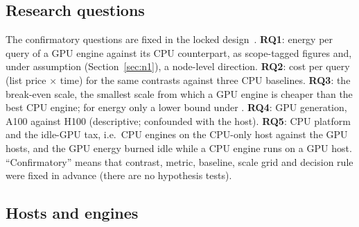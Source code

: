 \documentclass[sigconf]{acmart}
\begin{document}
\subsection{Research questions}
\label{sec:rqs}
The confirmatory questions are fixed in the locked design~\citelock{}. \textbf{RQ1}: energy
per query of a GPU engine against its CPU counterpart, as scope-tagged figures and, under
assumption \NOne{} (Section~\ref{sec:n1}), a node-level direction. \textbf{RQ2}: cost per
query (list price $\times$ time) for the same contrasts against three CPU baselines.
\textbf{RQ3}: the break-even scale, the smallest scale from which a GPU engine is cheaper
than the best CPU engine; for energy only a lower bound under \NOne. \textbf{RQ4}: GPU
generation, A100 against H100 (descriptive; confounded with the host).
\textbf{RQ5}: CPU platform and the idle-GPU tax, i.e.\ CPU engines on the CPU-only host
against the GPU hosts, and the GPU energy burned idle while a CPU engine runs on a GPU host.
``Confirmatory'' means that contrast, metric, baseline, scale grid and decision rule were
fixed in advance (there are no hypothesis tests).

\subsection{Hosts and engines}
\label{sec:hosts}
\end{document}
